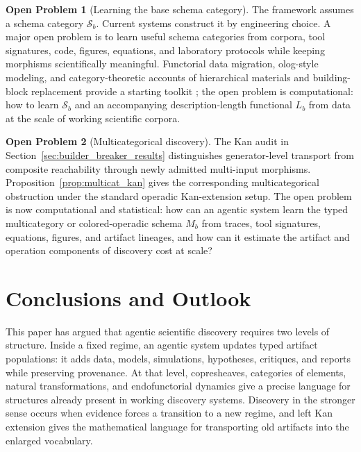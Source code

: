 \documentclass[11pt]{article}
\theoremstyle{definition}
\newtheorem*{openproblem}{Open Problem}
\newcommand{\Sschema}{\mathcal{S}}
\begin{document}
\begin{openproblem}[Learning the base schema category]
The framework assumes a schema category $\Sschema_b$. Current systems construct it by engineering choice. A major open problem is to learn useful schema categories from corpora, tool signatures, code, figures, equations, and laboratory protocols while keeping morphisms scientifically meaningful. Functorial data migration, olog-style modeling, and category-theoretic accounts of hierarchical materials and building-block replacement provide a starting toolkit \citep{spivak_schemas_2012,buehler_spivak_2011,giesa_spivak_2011_patterns,giesa_spivak_2012_buildingblock}; the open problem is computational: how to learn $\Sschema_b$ and an accompanying description-length functional $L_b$ from data at the scale of working scientific corpora.
\end{openproblem}

\begin{openproblem}[Multicategorical discovery]
The Kan audit in Section~\ref{sec:builder_breaker_results} distinguishes generator-level transport from composite reachability through newly admitted multi-input morphisms. Proposition~\ref{prop:multicat_kan} gives the corresponding multicategorical obstruction under the standard operadic Kan-extension setup. The open problem is now computational and statistical: how can an agentic system learn the typed multicategory or colored-operadic schema $M_b$ from traces, tool signatures, equations, figures, and artifact lineages, and how can it estimate the artifact and operation components of discovery cost at scale?
\end{openproblem}

\section{Conclusions and Outlook}
\label{sec:conclusions}

This paper has argued that agentic scientific discovery requires two levels of structure. Inside a fixed regime, an agentic system updates typed artifact populations: it adds data, models, simulations, hypotheses, critiques, and reports while preserving provenance. At that level, copresheaves, categories of elements, natural transformations, and endofunctorial dynamics give a precise language for structures already present in working discovery systems. Discovery in the stronger sense occurs when evidence forces a transition to a new regime, and left Kan extension gives the mathematical language for transporting old artifacts into the enlarged vocabulary.
\end{document}
